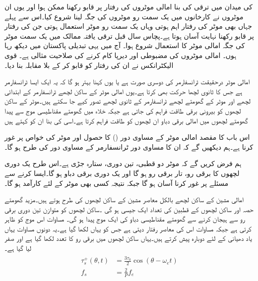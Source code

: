  کی میدان میں ترقی کی بنا امالی موٹروں کی رفتار پر قابو رکھنا ممکن ہوا اور یوں ان موٹروں نے کارخانوں میں یک سمت  رو موٹروں کی جگہ لینا شروع کیا۔اس سے پہلے جہاں بھی موٹر کی رفتار اہم  ہوتی وہاں یک سمت  رو موٹر  استعمال ہوتی جن کی رفتار پر قابو رکھنا نہایت آسان ہوتا ہے۔پچاس سال قبل ترقی یافتہ ممالک میں یک سمت موٹر  کی جگہ  امالی موٹر کا استعمال شروع ہوا۔ آج میں یہی تبدیلی پاکستان میں دیکھ رہا ہوں۔ امالی موٹروں کی مضبوطی اور دیرپا کام کرنے کی صلاحیت مثالی ہے۔ قوی الیکٹرانکس نے ان کی رفتار کو قابو کر کے  بلا مقابلہ بنا دیا۔

امالی موٹر درحقیقت  ٹرانسفارمر کی دوسری صورت ہے یا یوں کہنا بہتر ہو گا کہ یہ ایک ایسا ٹرانسفارمر ہے جس کا ثانوی لچھا حرکت بھی کرتا ہے۔یوں امالی موٹر کے ساکن لچھے ٹرانسفارمر کے ابتدائی لچھے اور موٹر کے گھومتے لچھے ٹرانسفارمر کے ثانوی لچھے تصور کیے جا سکتے ہیں۔موٹر کے ساکن لچھوں کو بیرونی برقی طاقت فراہم کی جاتی ہے جبکہ  خلاء میں گھومتے مقناطیسی موج سے پیدا گھومتے لچھوں میں امالی برقی دباو  ان لچھوں کو طاقت فراہم کرتا ہے۔اسی کی بنا ان کو  کہتے ہیں

 اس باب کا مقصد امالی موٹر کے مساوی دور  () کا حصول اور موٹر کی خواص پر غور کرنا ہے۔ہم دیکھیں گے کہ ان کا مساوی دور ٹرانسفارمر کے مساوی دور کی طرح  ہو گا۔

ہم فرض کریں گے کہ موٹر دو قطبی، تین دوری،  ستارہ  جڑی ہے۔اس طرح یک دوری لچھوں کا برقی رو، تار برقی رو ہو گا اور  یک دوری برقی دباو
  ہو گا۔ایسا کرنے سے مسئلے پر غور کرنا آسان ہو گا جبکہ نتیجہ کسی بھی موٹر کے لئے کارآمد ہو گا۔

امالی مشین کے ساکن لچھے بالکل معاصر مشین کے ساکن لچھوں کی طرح ہوتے ہیں۔مزید  گھومتے حصہ اور ساکن لچھوں کے قطبین کی تعداد ایک جیسی ہو گی ۔ساکن لچھوں کو متوازن تین دوری برقی رو سے ہیجان  کرنے سے گھومتے مقناطیسی دباو کی ایک  موج پیدا ہو گی۔ مساوات   اس موج کو ظاہر کرتی ہے جبکہ مساوات   اس کی معاصر رفتار  دیتی ہے جس کو یہاں  لکھا گیا ہے۔یہ دونوں مساوات یہاں یاد دھیانی کے لئے دوبارہ پیش کرتے  ہیں۔یہاں ساکن لچھوں میں برقی رو کا تعدد  لکھا گیا ہے اور   صفر لیا گیا ہے۔
\begin{gather}
\begin{aligned}\label{مساوات_امالی_گھومتا_مقناطیسی_دباو_الف}
\tau_s^+ (\theta,t)&=\frac{3 \tau_0}{2} \cos (\theta-\omega_ e t)\\
f_s&=\frac{2}{P} f_e
\end{aligned}
\end{gather}

